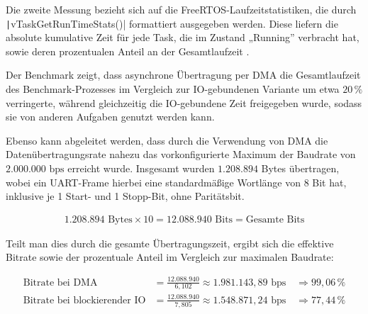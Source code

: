 Die zweite Messung bezieht sich auf die FreeRTOS-Laufzeitstatistiken, die durch
\linebreak \texttt|vTaskGetRunTimeStats()| formattiert ausgegeben
werden. Diese liefern die absolute kumulative Zeit für jede Task, die im Zustand
„Running” verbracht hat, sowie deren prozentualen Anteil an der Gesamtlaufzeit
\cite{freertos_runtime_stats}.

Der Benchmark zeigt, dass asynchrone Übertragung per DMA die Gesamtlaufzeit des
Benchmark-Prozesses im Vergleich zur IO-gebundenen Variante um etwa $20\,\%$
verringerte, während gleichzeitig die IO-gebundene Zeit freigegeben wurde,
sodass sie von anderen Aufgaben genutzt werden kann.

Ebenso kann abgeleitet werden, dass durch die Verwendung von DMA die
Datenübertragungsrate nahezu das vorkonfigurierte Maximum der Baudrate von
$2.000.000\text{ bps}$ erreicht wurde. Insgesamt wurden $1.208.894$ Bytes
übertragen, wobei ein UART-Frame hierbei eine standardmäßige Wortlänge von 8 Bit
hat, inklusive je 1 Start- und 1 Stopp-Bit, ohne Paritätsbit.

\begin{align*}
1.208.894\text{ Bytes} \times 10 = 12.088.940 \text{ Bits} = \text{Gesamte Bits}
\end{align*}

Teilt man dies durch die gesamte Übertragungszeit, ergibt sich die effektive
Bitrate sowie der prozentuale Anteil im Vergleich zur maximalen Baudrate:

\begin{align*}
\text{Bitrate bei DMA} &= \frac{12.088.940}{6,102} \approx 1.981.143,89 \text{ bps} \quad \Rightarrow 99,06\,\% \\
\text{Bitrate bei blockierender IO} &= \frac{12.088.940}{7,805} \approx 1.548.871,24 \text{ bps} \quad \Rightarrow 77,44\,\%
\end{align*}

%
%

\subsection{} %
